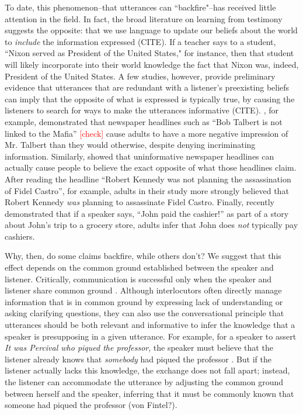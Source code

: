 \documentclass[10pt,letterpaper]{article}
\newcommand{\red}[1]{\textcolor{Red}{#1}}
\begin{document}
To date, this phenomenon--that utterances can ``backfire"--has received little attention in the field.  In fact, the broad literature on learning from testimony  suggests the opposite: that we use language to update our beliefs about the world to \emph{include} the information expressed (CITE).  If a teacher says to a student, ``Nixon served as President of the United States," for instance, then that student will likely incorporate into their world knowledge the fact that Nixon was, indeed, President of the United States.  A few studies, however, provide preliminary evidence that utterances that are redundant with a listener's preexisting beliefs can imply that the opposite of what is expressed is typically true, by causing the listeners to search for ways to make the utterances informative (CITE).  , for example, demonstrated that newspaper headlines such as ``Bob Talbert is not linked to the Mafia'' \red{[check]} cause adults to have a more negative impression of Mr. Talbert than they would otherwise, despite denying incriminating information.  Similarly,  showed that uninformative newspaper headlines can actually cause people to believe the exact opposite of what those headlines claim.  
After reading the headline ``Robert Kennedy was not planning the assassination of Fidel Castro'', for example, adults in their study more strongly believed that Robert Kennedy \emph{was} planning to assassinate Fidel Castro.  Finally,  recently demonstrated that if a speaker says, ``John paid the cashier!'' as part of a story about John's trip to a grocery store, adults infer that John does \emph{not} typically pay cashiers.

Why, then, do some claims backfire, while others don't?  We suggest that this effect depends on the common ground established between the speaker and listener.  Critically, communication is successful only when the speaker and listener share common ground \cite{Clark1996}.  Although interlocutors often directly manage information that is in common ground by  expressing lack of understanding or asking clarifying questions, they can also use the conversational principle that utterances should be both relevant and informative \cite{Grice1975} to infer the knowledge that a speaker is presupposing in a given utterance.
For example, for a speaker to assert \emph{It was Percival who piqued the professor}, the speaker must believe that the listener already knows that \emph{somebody} had piqued the professor \cite{Clark1977}.  But if the listener actually lacks this knowledge, the exchange does not fall apart; instead, the listener can accommodate the utterance by adjusting the common ground between herself and the speaker, inferring that it must be commonly known that someone had piqued the professor (von Fintel?).
\end{document}
